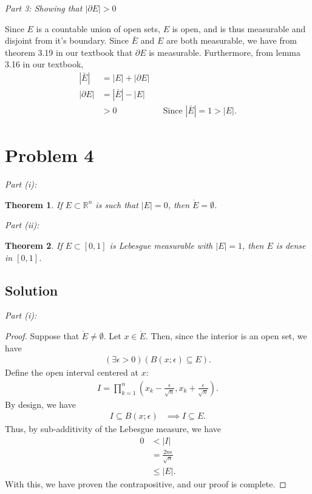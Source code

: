 \documentclass[10pt,a4paper]{article}
\makeatletter
\theoremstyle{theorem}
\newtheorem{theorem}{Theorem}
\newcommand{\proofpart}[2]{%
  \par
  \addvspace{\medskipamount}%
  \noindent\emph{Part #1: #2}\par\nobreak
  \addvspace{\smallskipamount}%
  \@afterheading
}
\theoremstyle{definition}
\makeatother
\begin{document}
\proofpart{3}{Showing that $|\partial E| > 0$}
Since $E$ is a countable union of open sets, $E$ is open, and is thus measurable and disjoint from it's boundary. Since $\bar{E}$ and $E$ are both measurable, we have from theorem 3.19 in our textbook that $\partial E$ is measurable. Furthermore, from lemma 3.16 in our textbook,
\begin{align*}
|\bar{E}| &= |E| + |\partial E|\\
|\partial E| &= |\bar{E}| - |E|\\
&> 0 && \text{Since } |\bar{E}| = 1 > |E|.
\end{align*}

\section*{Problem 4}
\proofpart{(i)}{}
\begin{theorem}
If $E \subset \mathbb{R}^n$ is such that $|E| = 0$, then $\mathring{E} = \emptyset$.
\end{theorem}

\proofpart{(ii)}{}
\begin{theorem}
If $E \subset [0, 1]$ is Lebesgue measurable with $|E| = 1$, then $E$ is dense in $[0, 1]$.
\end{theorem}

\subsection*{Solution}
\proofpart{(i)}{}
\begin{proof}
Suppose that $\mathring{E} \not = \emptyset$.  Let $x \in \mathring{E}$. Then, since the interior is an open set, we have
\begin{align*}
(\exists \epsilon > 0)(B(x; \epsilon) \subseteq E).
\end{align*}
Define the open interval centered at $x$:
\begin{align*}
I = \prod_{k=1}^n (x_k - \frac{\epsilon}{\sqrt{n}},  x_k + \frac{\epsilon}{\sqrt{n}}).
\end{align*}
By design, we have 
\begin{align*}
I \subseteq B(x; \epsilon) &\implies I \subseteq E.
\end{align*}
Thus,  by sub-additivity of the Lebesgue measure, we have
\begin{align*}
0 &< |I|\\
&= \frac{2n\epsilon}{ \sqrt{n}}\\
&\leq |E|.
\end{align*}
With this, we have proven the contrapositive, and our proof is complete.
\end{proof}
\end{document}
